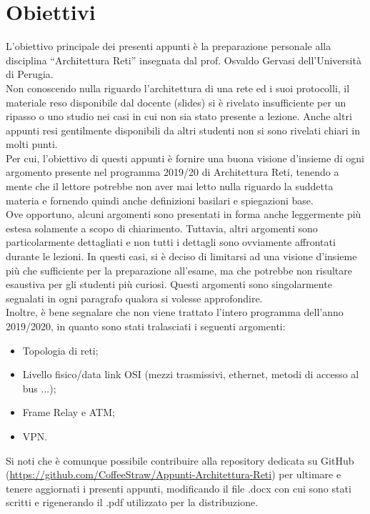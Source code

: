 \section*{Obiettivi}
    L’obiettivo principale dei presenti appunti è la preparazione personale alla disciplina
    “Architettura Reti” insegnata dal prof. Osvaldo Gervasi dell’Università di Perugia.\\

    Non conoscendo nulla riguardo l’architettura di una rete ed i suoi protocolli, il materiale reso
    disponibile dal docente (slides) si è rivelato insufficiente per un ripasso o uno studio nei casi in
    cui non sia stato presente a lezione. Anche altri appunti resi gentilmente disponibili da altri
    studenti non si sono rivelati chiari in molti punti.\\

    Per cui, l’obiettivo di questi appunti è fornire una buona visione d’insieme di ogni argomento
    presente nel programma 2019/20 di Architettura Reti, tenendo a mente che il lettore potrebbe
    non aver mai letto nulla riguardo la suddetta materia e fornendo quindi anche definizioni
    basilari e spiegazioni base.\\

    Ove opportuno, alcuni argomenti sono presentati in forma anche leggermente più estesa
    solamente a scopo di chiarimento. Tuttavia, altri argomenti sono particolarmente dettagliati e
    non tutti i dettagli sono ovviamente affrontati durante le lezioni. In questi casi, si è deciso di
    limitarsi ad una visione d’insieme più che sufficiente per la preparazione all’esame, ma che
    potrebbe non risultare esaustiva per gli studenti più curiosi. Questi argomenti sono
    singolarmente segnalati in ogni paragrafo qualora si volesse approfondire.\\
    
    Inoltre, è bene segnalare che non viene trattato l’intero programma dell’anno 2019/2020, in
    quanto sono stati tralasciati i seguenti argomenti:
    
    \begin{itemize}
        \item Topologia di reti;
        \item Livello fisico/data link OSI (mezzi trasmissivi, ethernet, metodi di accesso al bus ...);
        \item Frame Relay e ATM;
        \item VPN.
    \end{itemize}

    Si noti che è comunque possibile contribuire alla repository dedicata su GitHub
    (\url{https://github.com/CoffeeStraw/Appunti-Architettura-Reti}) per ultimare e tenere aggiornati
    i presenti appunti, modificando il file .docx con cui sono stati scritti e rigenerando il .pdf
    utilizzato per la distribuzione.